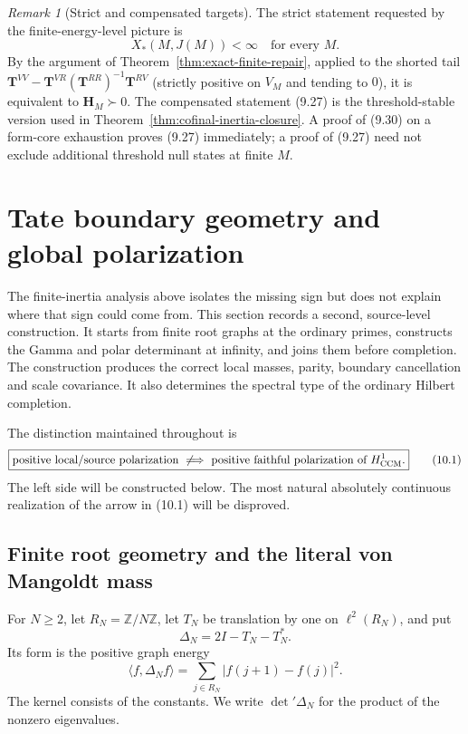 \documentclass[11pt]{amsart}
\theoremstyle{definition}
\theoremstyle{remark}
\newtheorem{remark}[theorem]{Remark}
\begin{document}
\begin{remark}[Strict and compensated targets]
The strict statement requested by the finite-energy-level picture is
\[
 \boxed{X_*(M,J(M))<\infty\quad\text{for every }M.}
\tag{9.30}
\]
By the argument of Theorem~\ref{thm:exact-finite-repair}, applied to the
shorted tail
\(\mathbf T^{VV}-\mathbf T^{VR}(\mathbf T^{RR})^{-1}\mathbf T^{RV}\)
(strictly positive on \(V_M\) and tending to \(0\)), it is equivalent to
\(\mathbf H_M\succ0\).  The compensated statement (9.27) is
the threshold-stable version used in Theorem~\ref{thm:cofinal-inertia-closure}.  A proof of (9.30) on a
form-core exhaustion proves (9.27) immediately; a proof of (9.27) need
not exclude additional threshold null states at finite \(M\).
\end{remark}

\section{Tate boundary geometry and global polarization}
\label{sec:polarization-geometry}

The finite-inertia analysis above isolates the missing sign but does not
explain where that sign could come from.  This section records a second,
source-level construction.  It starts from finite root graphs at the
ordinary primes, constructs the Gamma and polar determinant at infinity,
and joins them before completion.  The construction produces the correct
local masses, parity, boundary cancellation and scale covariance.  It also
determines the spectral type of the ordinary Hilbert completion.

The distinction maintained throughout is
\[
 \boxed{
 \text{positive local/source polarization}
 \ \not\Longrightarrow\ 
 \text{positive faithful polarization of }H^1_{\rm CCM}.}
 \tag{10.1}
\]
The left side will be constructed below.  The most natural absolutely
continuous realization of the arrow in (10.1) will be disproved.

\subsection{Finite root geometry and the literal von Mangoldt mass}

For \(N\ge2\), let \(R_N=\mathbb Z/N\mathbb Z\), let \(T_N\) be
translation by one on \(\ell^2(R_N)\), and put
\[
 \Delta_N=2I-T_N-T_N^*.
 \tag{10.2}
\]
Its form is the positive graph energy
\[
 \langle f,\Delta_Nf\rangle
 =\sum_{j\in R_N}|f(j+1)-f(j)|^2.
 \tag{10.3}
\]
The kernel consists of the constants.  We write \(\det'\Delta_N\) for
the product of the nonzero eigenvalues.
\end{document}
